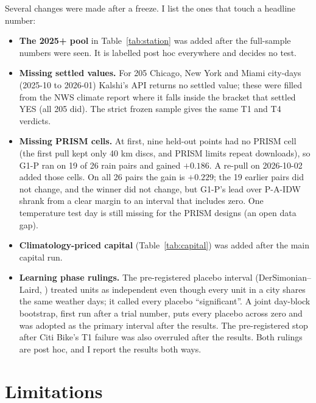 \documentclass[11pt]{article}
\begin{document}
Several changes were made after a freeze. I list the ones that touch a headline number:
\begin{itemize}
\item \textbf{The 2025+ pool} in Table~\ref{tab:station} was added after the full-sample numbers were seen. It is labelled post hoc everywhere and decides no test.
\item \textbf{Missing settled values.} For 205 Chicago, New York and Miami city-days (2025-10 to 2026-01) Kalshi's API returns no settled value; these were filled from the NWS climate report where it falls inside the bracket that settled YES (all 205 did). The strict frozen sample gives the same T1 and T4 verdicts.
\item \textbf{Missing PRISM cells.} At first, nine held-out points had no PRISM cell (the first pull kept only 40 km discs, and PRISM limits repeat downloads), so G1-P ran on 19 of 26 rain pairs and gained $+0.186$. A re-pull on 2026-10-02 added those cells. On all 26 pairs the gain is $+0.229$; the 19 earlier pairs did not change, and the winner did not change, but G1-P's lead over P-A-IDW shrank from a clear margin to an interval that includes zero. One temperature test day is still missing for the PRISM designs (an open data gap).
\item \textbf{Climatology-priced capital} (Table~\ref{tab:capital}) was added after the main capital run.
\item \textbf{Learning phase rulings.} The pre-registered placebo interval (DerSimonian--Laird, \citealp{dersimonian1986}) treated units as independent even though every unit in a city shares the same weather days; it called every placebo ``significant''. A joint day-block bootstrap, first run after a trial number, puts every placebo across zero and was adopted as the primary interval after the results. The pre-registered stop after Citi Bike's T1 failure was also overruled after the results. Both rulings are post hoc, and I report the results both ways.
\end{itemize}

\section{Limitations}
\label{sec:limits}
\end{document}
